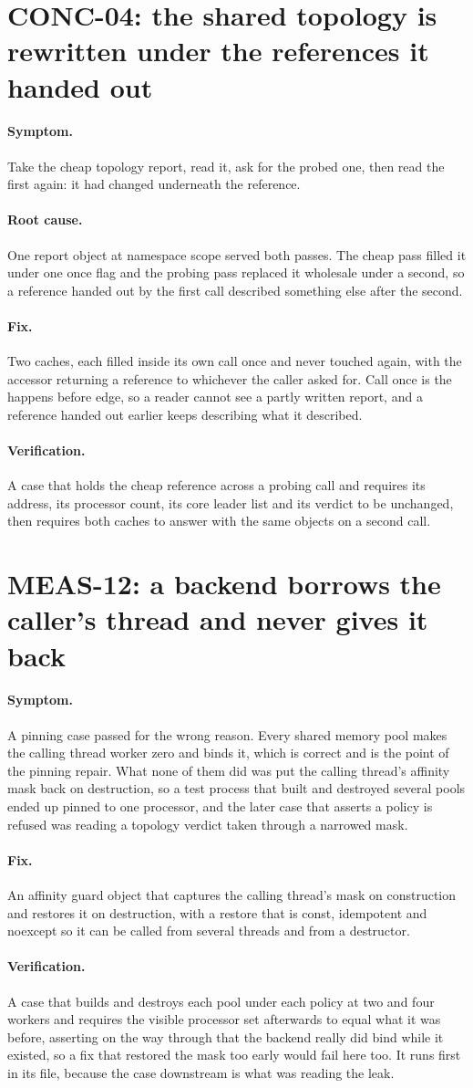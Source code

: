 \documentclass[11pt,a4paper]{report}
\newcommand{\symptom}[1]{\paragraph{Symptom.}#1}
\newcommand{\rootcause}[1]{\paragraph{Root cause.}#1}
\newcommand{\fix}[1]{\paragraph{Fix.}#1}
\newcommand{\verification}[1]{\paragraph{Verification.}#1}
\begin{document}
\section{CONC-04: the shared topology is rewritten under the references it handed out}

\symptom{Take the cheap topology report, read it, ask for the probed one, then
read the first again: it had changed underneath the reference.}

\rootcause{One report object at namespace scope served both passes. The cheap
pass filled it under one once flag and the probing pass replaced it wholesale
under a second, so a reference handed out by the first call described something
else after the second.}

\fix{Two caches, each filled inside its own call once and never touched again,
with the accessor returning a reference to whichever the caller asked for. Call
once is the happens before edge, so a reader cannot see a partly written report,
and a reference handed out earlier keeps describing what it described.}

\verification{A case that holds the cheap reference across a probing call and
requires its address, its processor count, its core leader list and its verdict
to be unchanged, then requires both caches to answer with the same objects on a
second call.}

\section{MEAS-12: a backend borrows the caller's thread and never gives it back}

\symptom{A pinning case passed for the wrong reason. Every shared memory pool
makes the calling thread worker zero and binds it, which is correct and is the
point of the pinning repair. What none of them did was put the calling thread's
affinity mask back on destruction, so a test process that built and destroyed
several pools ended up pinned to one processor, and the later case that asserts a
policy is refused was reading a topology verdict taken through a narrowed mask.}

\fix{An affinity guard object that captures the calling thread's mask on
construction and restores it on destruction, with a restore that is const,
idempotent and noexcept so it can be called from several threads and from a
destructor.}

\verification{A case that builds and destroys each pool under each policy at two
and four workers and requires the visible processor set afterwards to equal what
it was before, asserting on the way through that the backend really did bind
while it existed, so a fix that restored the mask too early would fail here too.
It runs first in its file, because the case downstream is what was reading the
leak.}
\end{document}
